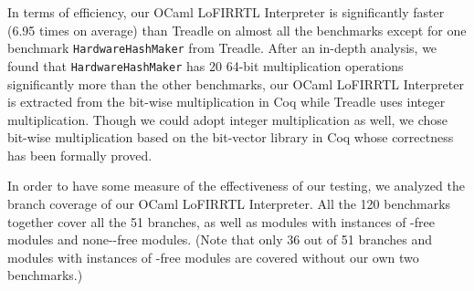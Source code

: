 In terms of efficiency, our OCaml LoFIRRTL Interpreter is significantly faster (6.95 times on average) than Treadle on almost all the benchmarks
except for one benchmark \texttt{HardwareHashMaker} from Treadle.
After an in-depth analysis, we found that \texttt{HardwareHashMaker} has 20 64-bit multiplication operations significantly more than the other benchmarks,
our OCaml LoFIRRTL Interpreter is extracted from the bit-wise multiplication in Coq while Treadle uses integer multiplication.
Though we could adopt integer multiplication as well,
we chose bit-wise multiplication based on the bit-vector library in Coq whose correctness has been formally proved.
%
%


In order to have some measure of the effectiveness of our testing, we analyzed the branch coverage of our OCaml LoFIRRTL Interpreter.
All the 120 benchmarks together cover all the 51 branches, as well as modules with instances of -free modules
and none--free modules. (Note that only 36 out of 51 branches and modules with instances of -free modules are covered without our own two benchmarks.)

